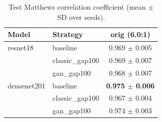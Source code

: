 \begin{table}[htbp]
\centering
\caption{Test Matthews correlation coefficient (mean $\pm$ SD over seeds).}
\label{tab:mcc}
\begin{tabular}{llc}
\toprule
Model & Strategy & orig (6.0:1) \\
\midrule
resnet18 & baseline & 0.969 $\pm$ 0.005 \\
 & classic\_gap100 & 0.969 $\pm$ 0.007 \\
 & gan\_gap100 & 0.968 $\pm$ 0.007 \\
\addlinespace
densenet201 & baseline & \textbf{0.975 $\pm$ 0.006} \\
 & classic\_gap100 & 0.967 $\pm$ 0.004 \\
 & gan\_gap100 & 0.974 $\pm$ 0.003 \\
\bottomrule
\end{tabular}
\end{table}